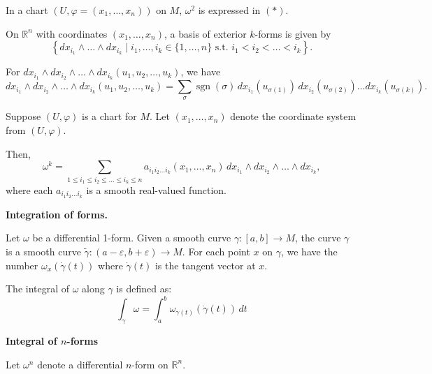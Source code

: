 \documentclass[11pt]{article}
\theoremstyle{definition}
\theoremstyle{remark}
\begin{document}
In a chart $(U, \varphi = (x_1, \dots, x_n))$ on $M$, $\omega^2$ is expressed in $(\ast)$.

On $\mathbb{R}^n$ with coordinates $(x_1, \dots, x_n)$, a basis of exterior $k$-forms is given by
\[
\left\{ dx_{i_1} \wedge \dots \wedge dx_{i_k} \mid i_1, \dots, i_k \in \{1, \dots, n\} \text{ s.t. } i_1 < i_2 < \dots < i_k \right\}.
\]

For $dx_{i_1} \wedge dx_{i_2} \wedge \dots \wedge dx_{i_k}(u_1, u_2, \dots, u_k)$, we have
\[
dx_{i_1} \wedge dx_{i_2} \wedge \dots \wedge dx_{i_k}(u_1, u_2, \dots, u_k) = \sum_{\sigma} \operatorname{sgn}(\sigma) \, dx_{i_1}(u_{\sigma(1)}) \, dx_{i_2}(u_{\sigma(2)}) \dots dx_{i_k}(u_{\sigma(k)}).
\]

Suppose \((U, \varphi)\) is a chart for \(M\). Let \((x_1, \dots, x_n)\) denote the coordinate system from \((U, \varphi)\).

Then,
\[
\omega^k = \sum_{1 \leq i_1 \leq i_2 \leq \dots \leq i_k \leq n} a_{i_1 i_2 \dots i_k}(x_1, \dots, x_n) \, dx_{i_1} \wedge dx_{i_2} \wedge \dots \wedge dx_{i_k},
\]
where each \(a_{i_1 i_2 \dots i_k}\) is a smooth real-valued function.

\textbf{Integration of forms.}

Let $\omega$ be a differential 1-form. Given a smooth curve $\gamma: [a, b] \to M$, the curve $\gamma$ is a smooth curve $\tilde{\gamma}: (a-\varepsilon, b+\varepsilon) \to M$. For each point $x$ on $\gamma$, we have the number $\omega_x(\dot{\gamma}(t))$ where $\dot{\gamma}(t)$ is the tangent vector at $x$.

The integral of $\omega$ along $\gamma$ is defined as:
\[
\int_\gamma \omega = \int_a^b \omega_{\gamma(t)}(\dot{\gamma}(t)) \, dt
\]

\begin{figure}[h]
    \centering
\end{figure}

\textbf{Integral of $n$-forms}

Let $\omega^n$ denote a differential $n$-form on $\mathbb{R}^n$.
\end{document}
